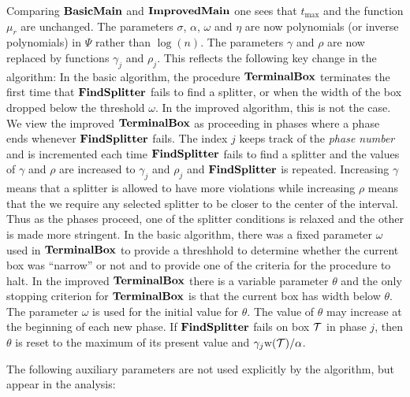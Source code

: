 \documentclass{acmsmall}
\newcommand{\cT}{{\cal T}}
\newcommand{\terminalbox}{{\rm{\bf TerminalBox}}}
\newcommand{\taint}{\eta}
\newcommand{\width}{{\bf {\rm  w}}}
\newcommand{\gridprec}{\alpha}
\newcommand{\errorcont}{\Psi}
\newcommand{\ssz}{\sigma}
\newcommand{\basicmain}{{\rm {\bf BasicMain}}}
\newcommand{\improvedmain}{{\rm {\bf ImprovedMain}}}
\newcommand{\findsplitter}{{\rm {\bf FindSplitter}}}
\begin{document}
Comparing $\basicmain$ and $\improvedmain$ one sees that $t_{\max}$ and the function $\mu_r$
are unchanged.    The parameters $\ssz$, $\gridprec$, $\omega$ and $\taint$ are
now polynomials (or inverse polynomials) in $\errorcont$ rather than $\log(n)$.  
The parameters $\gamma$ and $\rho$ are now replaced by functions
$\gamma_j$ and $\rho_j$.  This reflects the following key change in the algorithm:
In the basic algorithm, the procedure $\terminalbox$ terminates the first time that $\findsplitter$ fails to
find a splitter, or when the width of the box dropped below the threshold $\omega$.  
In the improved algorithm, this is not the case.   We view the improved
$\terminalbox$ as proceeding in phases where a phase
ends whenever $\findsplitter$ fails.  The index $j$
keeps track of the {\em phase number} and is incremented each time $\findsplitter$ fails to find a splitter
and the values of $\gamma$ and $\rho$ are increased to $\gamma_j$ and $\rho_j$ 
and $\findsplitter$ is repeated. Increasing $\gamma$ means that a splitter
is allowed to have more violations while increasing $\rho$ means that the we require any selected splitter to be 
closer to the center of the interval. Thus as the phases proceed,  one of the splitter 
conditions is relaxed and the other is made more stringent.
In the basic algorithm, there was a fixed parameter $\omega$  used in $\terminalbox$ to provide
a threshhold to determine whether the current box was ``narrow'' or not and to provide one of the criteria
for the procedure to halt.  In the improved $\terminalbox$ there is a variable parameter $\theta$ and the only stopping
criterion for $\terminalbox$ is that the current box has width below $\theta$. The 
parameter $\omega$ is used for the initial value for $\theta$. 
The value of $\theta$ may increase
at the beginning of each new phase.  If $\findsplitter$ fails on box $\cT$ in phase $j$, then $\theta$ is reset to
the maximum of its present value and $ \gamma_j \width(\cT)/\gridprec$.


The following auxiliary parameters are not used explicitly by the algorithm, but appear in the analysis:
\end{document}
